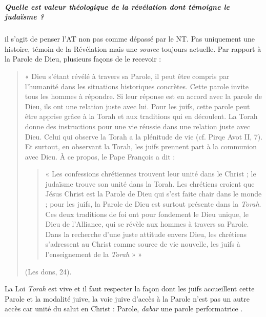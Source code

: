       
     \subparagraph{Quelle est valeur théologique de la révélation dont témoigne le
      judaïsme ?}
      il s'agit de penser l'AT non pas comme dépassé par le NT. Pas uniquement une histoire, témoin de la Révélation mais une \textit{source} toujours actuelle.
      Par rapport à la Parole de Dieu, plusieurs façons de le recevoir : 
      
          \begin{quote}
    «  Dieu  s’étant  révélé  à  travers  sa  Parole,  il  peut  être  compris  par  l’humanité  dans  les  situations historiques  concrètes.  Cette  parole  invite  tous  les  hommes  à  répondre.  Si  leur  réponse  est  en accord  avec  la  parole  de  Dieu,  ils  ont  une  relation  juste  avec  lui.  Pour  les  juifs,  cette  parole peut  être  apprise  grâce  à  la  Torah  et  aux  traditions  qui  en  découlent.  La  Torah  donne  des instructions  pour  une  vie  réussie  dans  une  relation  juste  avec  Dieu.  Celui  qui  observe  la  Torah a  la  plénitude  de  vie  (cf.  Pirqe  Avot  II,  7).  Et  surtout,  en  observant  la  Torah,  les  juifs  prennent part  à  la  communion  avec  Dieu.  À  ce  propos,  le  Pape  François  a  dit  :  \begin{quote}
        «  Les  confessions chrétiennes  trouvent  leur  unité  dans  le  Christ  ;  le  judaïsme  trouve  son  unité  dans  la  Torah.  Les chrétiens  croient  que  Jésus  Christ  est  la  Parole  de  Dieu  qui  s’est  faite  chair  dans  le  monde  ; pour  les  juifs,  la  Parole  de  Dieu  est  surtout  présente  dans  la  \textit{Torah}.  Ces  deux  traditions  de  foi ont  pour  fondement  le  Dieu  unique,  le  Dieu  de  l’Alliance,  qui  se  révèle  aux  hommes  à  travers sa  Parole.  Dans  la  recherche  d’une  juste  attitude  envers  Dieu,  les  chrétiens  s’adressent  au Christ  comme  source  de  vie  nouvelle,  les  juifs  à  l’enseignement  de  la  \textit{Torah}  »    »
    \end{quote}  (Les  dons, 24). 
\end{quote}
    La Loi \textit{Torah}  est vive et il faut respecter la façon dont les juifs accueillent cette Parole et la modalité juive, la voie juive d'accès à la Parole n'est pas un autre accès car unité du salut en Christ : 
Parole, \emph{dabar} une parole performatrice .


